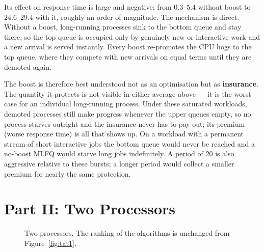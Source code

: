 \documentclass[11pt,a4paper]{article}
\begin{document}
Its effect on response time is large and negative: from $0.3$--$5.4$ without
boost to $24.6$--$29.4$ with it, roughly an order of magnitude. The mechanism
is direct. Without a boost, long-running processes sink to the bottom queue and
stay there, so the top queue is occupied only by genuinely new or interactive
work and a new arrival is served instantly. Every boost re-promotes the CPU
hogs to the top queue, where they compete with new arrivals on equal terms
until they are demoted again.

The boost is therefore best understood not as an optimisation but as
\textbf{insurance}. The quantity it protects is not visible in either average
above --- it is the worst case for an individual long-running process. Under
these saturated workloads, demoted processes still make progress whenever the
upper queues empty, so no process starves outright and the insurance never has
to pay out; its premium (worse response time) is all that shows up. On a
workload with a permanent stream of short interactive jobs the bottom queue
would never be reached and a no-boost MLFQ would starve long jobs indefinitely.
A period of 20 is also aggressive relative to these bursts; a longer period
would collect a smaller premium for nearly the same protection.

\section{Part II: Two Processors}

\begin{figure}[h]
\centering
{}
\caption{Two processors. The ranking of the algorithms is unchanged from
Figure~\ref{fig:tat1}.}
\label{fig:tat2}
\end{figure}
\end{document}

